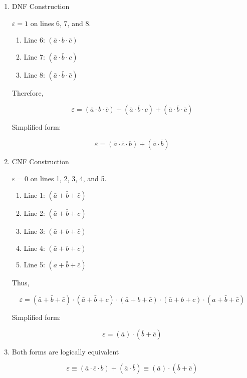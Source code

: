\documentclass[12pt,a4paper,openany]{article}
\begin{document}
\begin{enumerate}
\item DNF Construction

  $\varepsilon = 1$ on lines 6, 7, and 8.

  \begin{enumerate}
  \item Line 6: $(\bar{a} \cdot b \cdot \bar{c})$
  \item Line 7: $(\bar{a} \cdot \bar{b} \cdot c)$
  \item Line 8: $(\bar{a} \cdot \bar{b} \cdot \bar{c})$
  \end{enumerate}

  Therefore,

  $$
   \varepsilon = (\bar{a} \cdot b \cdot \bar{c}) + (\bar{a} \cdot \bar{b} \cdot c) + (\bar{a} \cdot \bar{b} \cdot \bar{c})
   $$
   
   Simplified form:
   
   $$
   \varepsilon = (\bar{a} \cdot \bar{c} \cdot b) + (\bar{a} \cdot \bar{b})
   $$

\item CNF Construction

  $\varepsilon = 0$ on lines 1, 2, 3, 4, and 5.

  \begin{enumerate}
  \item Line 1: $(\bar{a} + \bar{b} + \bar{c})$
  \item Line 2: $(\bar{a} + \bar{b} + c)$
  \item Line 3: $(\bar{a} + b + \bar{c})$
  \item Line 4: $(\bar{a} + b + c)$
  \item Line 5: $(a + \bar{b} + \bar{c})$
  \end{enumerate}

  Thus,

  $$
   \varepsilon = (\bar{a} + \bar{b} + \bar{c}) \cdot (\bar{a} + \bar{b} + c) \cdot (\bar{a} + b + \bar{c}) \cdot (\bar{a} + b + c) \cdot (a + \bar{b} + \bar{c})
   $$
   
   Simplified form:
   
   $$
   \varepsilon = (\bar{a}) \cdot (\bar{b} + \bar{c})
   $$

\item Both forms are logically equivalent

  $$
   \varepsilon \equiv (\bar{a} \cdot \bar{c} \cdot b) + (\bar{a} \cdot \bar{b}) \equiv (\bar{a}) \cdot (\bar{b} + \bar{c})
   $$
\end{enumerate}
\end{document}
